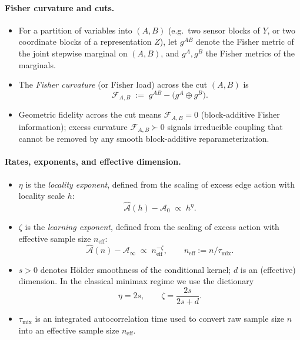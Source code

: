 \documentclass[11pt]{article}
\newcommand{\1}{\mathbf{1}}
\begin{document}
\paragraph{Fisher curvature and cuts.}
\begin{itemize}[leftmargin=1.7em,itemsep=2pt,topsep=2pt]
  \item For a partition of variables into $(A,B)$ (e.g.\ two sensor blocks of $Y$, or two coordinate blocks of a representation $Z$), let $g^{AB}$ denote the Fisher metric of the joint stepwise marginal on $(A,B)$, and $g^A,g^B$ the Fisher metrics of the marginals.
  \item The \emph{Fisher curvature} (or Fisher load) across the cut $(A,B)$ is
  \[
    \mathcal{F}_{A,B}
    \;:=\;
    g^{AB} - \bigl(g^A \oplus g^B\bigr).
  \]
  \item Geometric fidelity across the cut means $\mathcal{F}_{A,B}=0$ (block-additive Fisher information); excess curvature $\mathcal{F}_{A,B}\succ 0$ signals irreducible coupling that cannot be removed by any smooth block-additive reparameterization.
\end{itemize}

\paragraph{Rates, exponents, and effective dimension.}
\begin{itemize}[leftmargin=1.7em,itemsep=2pt,topsep=2pt]
  \item $\eta$ is the \emph{locality exponent}, defined from the scaling of excess edge action with locality scale $h$:
  \[
    \widehat{\mathcal A}(h) - \mathcal A_0 \;\propto\; h^{\eta}.
  \]
  \item $\zeta$ is the \emph{learning exponent}, defined from the scaling of excess action with effective sample size $n_{\mathrm{eff}}$:
  \[
    \widehat{\mathcal A}(n) - \mathcal A_\infty \;\propto\; n_{\mathrm{eff}}^{-\zeta},
    \qquad n_{\mathrm{eff}} := n/\tau_{\mathrm{mix}}.
  \]
  \item $s>0$ denotes Hölder smoothness of the conditional kernel; $d$ is an (effective) dimension. In the classical minimax regime we use the dictionary
  \[
    \eta = 2s,
    \qquad
    \zeta = \frac{2s}{2s+d}.
  \]
  \item $\tau_{\mathrm{mix}}$ is an integrated autocorrelation time used to convert raw sample size $n$ into an effective sample size $n_{\mathrm{eff}}$.
\end{itemize}
\end{document}
